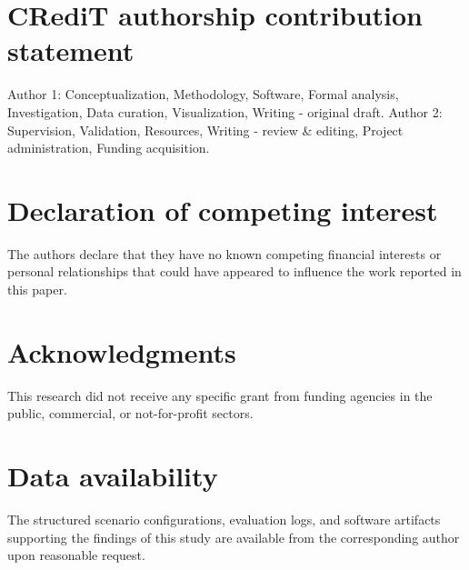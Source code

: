\documentclass[preprint,12pt]{elsarticle}
\begin{document}
\section*{CRediT authorship contribution statement}
Author 1: Conceptualization, Methodology, Software, Formal analysis, Investigation, Data curation, Visualization, Writing - original draft. Author 2: Supervision, Validation, Resources, Writing - review \& editing, Project administration, Funding acquisition.

\section*{Declaration of competing interest}
The authors declare that they have no known competing financial interests or personal relationships that could have appeared to influence the work reported in this paper.

\section*{Acknowledgments}
This research did not receive any specific grant from funding agencies in the public, commercial, or not-for-profit sectors.

\section*{Data availability}
The structured scenario configurations, evaluation logs, and software artifacts supporting the findings of this study are available from the corresponding author upon reasonable request.


{\sloppy}
\end{document}
